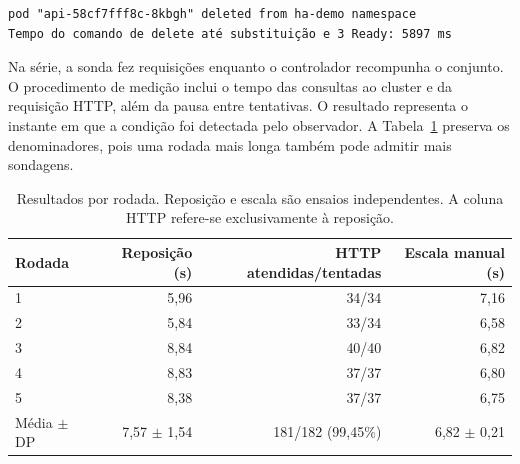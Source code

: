 \par\noindent\begin{minipage}{\linewidth}\begin{lstlisting}
pod "api-58cf7fff8c-8kbgh" deleted from ha-demo namespace
Tempo do comando de delete até substituição e 3 Ready: 5897 ms
\end{lstlisting}
\end{minipage}\par

Na série, a sonda fez requisições enquanto o controlador recompunha o conjunto. O procedimento de medição inclui o tempo das consultas ao cluster e da requisição HTTP, além da pausa entre tentativas. O resultado representa o instante em que a condição foi detectada pelo observador. A Tabela~\ref{tab:medidas} preserva os denominadores, pois uma rodada mais longa também pode admitir mais sondagens.
\begin{table}[H]\centering\caption{Resultados por rodada. Reposição e escala são ensaios independentes. A coluna HTTP refere-se exclusivamente à reposição.}\label{tab:medidas}
\begin{tabular}{lrrr}\toprule Rodada & Reposição (s) & HTTP atendidas/tentadas & Escala manual (s)\\\midrule
1 & 5,96 & 34/34 & 7,16\\
2 & 5,84 & 33/34 & 6,58\\
3 & 8,84 & 40/40 & 6,82\\
4 & 8,83 & 37/37 & 6,80\\
5 & 8,38 & 37/37 & 6,75\\\midrule
Média $\pm$ DP & 7,57 $\pm$ 1,54 & 181/182 (99,45\%) & 6,82 $\pm$ 0,21\\\bottomrule\end{tabular}\end{table}

